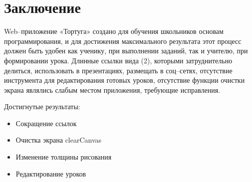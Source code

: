 \chapter*{Заключение}						%

Web–приложение «Тортуга» создано для обучения школьников основам программирования, и для достижения максимального результата этот процесс должен быть удобен как ученику, при выполнении заданий, так и учителю, при формировании урока. Длинные ссылки вида (2), которыми затруднительно делиться, использовать в презентациях, размещать в соц–сетях, отсутствие инструмента для редактирования готовых уроков, отсутствие функции очистки экрана являлись слабым местом приложения, требующие исправления.\par
\vspace{16}
Достигнутые результаты:
\begin{itemize}
  \item Сокращение ссылок
  \item Очистка экрана clearCanvas
  \item Изменение толщины рисования
  \item Редактирование уроков
\end{itemize}


\clearpage